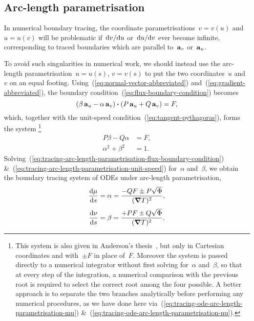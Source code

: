 \subsection{Arc-length parametrisation}
\label{sec:curvilinear.tracing.arc-length}

In numerical boundary tracing,
the coordinate parametrisations~$v = v (u)$ and~$u = u (v)$
will be problematic
if~$\mathop{}\!\mathrm{d} v / {\mathop{}\!\mathrm{d} u}$ or~$\mathop{}\!\mathrm{d} u / {\mathop{}\!\mathrm{d} v}$ ever become infinite,
corresponding to traced boundaries
which are parallel to~$\mathop{}\!\boldsymbol{\mathbf{a}}_{v}$ or~$\mathop{}\!\boldsymbol{\mathbf{a}}_{u}$.

To avoid such singularities in numerical work, we should instead use
the arc-length parametrisation~$u = u (s)$, $v = v(s)$
to put the two coordinates~$u$ and~$v$ on an equal footing.
Using~(\ref{eq:normal-vector-abbreviated})
and~(\ref{eq:gradient-abbreviated}),
the boundary condition~(\ref{eq:flux-boundary-condition}) becomes
\[
  \roundbr[\bulkysize]{\beta \basisvec{u} - \alpha \basisvec{v}}
    \dotp
  \roundbr[\bulkysize]{P \basisvec{u} + Q \basisvec{v}}
    =
  F,
\]
which, together with the unit-speed condition~(\ref{eq:tangent-pythagoras}),
forms the system%
\footnote{
  This system is also given
  in Anderson's thesis~\cite[(A.1) \&~(A.2)]{
    anderson-2002-thesis-boundary-tracing-pdes
  },
  but only in Cartesian coordinates
  and with~$\pm F$ in place of~$F$.
  Moreover the system is passed directly to a numerical integrator
  without first solving for~$\alpha$ and~$\beta$,
  so that at every step of the integration,
  a numerical comparison with the previous root
  is required to select the correct root among the four possible.
  A better approach is to separate the two branches analytically
  before performing any numerical procedures,
  as we have done here
  via~(\ref{eq:tracing-ode-arc-length-parametrisation-mu})
  \&~(\ref{eq:tracing-ode-arc-length-parametrisation-nu}).
}
\begin{align}
  P \beta - Q \alpha &= F,
    \label{eq:tracing-arc-length-parametrisation-flux-boundary-condition} \\
  \alpha^2 + \beta^2 &= 1.
    \label{eq:tracing-arc-length-parametrisation-unit-speed}
\end{align}
Solving~(\ref{eq:tracing-arc-length-parametrisation-flux-boundary-condition})
\&~(\ref{eq:tracing-arc-length-parametrisation-unit-speed})
for~$\alpha$ and~$\beta$, we obtain
the boundary tracing system of ODEs under arc-length parametrisation,
\begin{align}
  \tder{\mu}{s} &= \alpha = \frac{-Q F \pm P \sqrt{\Phi}}{(\del T)^2},
    \label{eq:tracing-ode-arc-length-parametrisation-mu} \\[\tallspace]
  \tder{\nu}{s} &= \beta = \frac{+P F \pm Q \sqrt{\Phi}}{(\del T)^2},
    \label{eq:tracing-ode-arc-length-parametrisation-nu}
\end{align}
